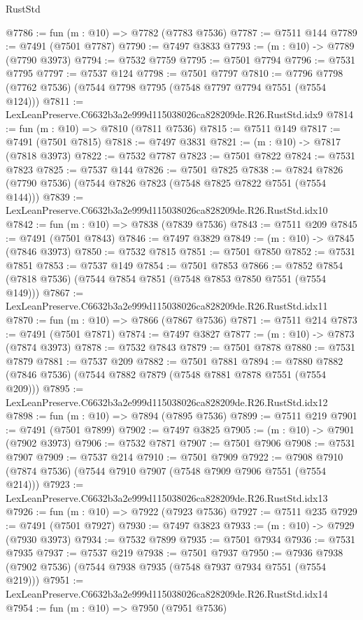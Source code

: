 \begin{lexlean}{RustStd}
\begin{coremodule}
@7786 := fun (m : @10) => @7782 (@7783 @7536)
@7787 := @7511 @144
@7789 := @7491 (@7501 @7787)
@7790 := @7497 @3833
@7793 := (m : @10) -> @7789 (@7790 @3973)
@7794 := @7532 @7759
@7795 := @7501 @7794
@7796 := @7531 @7795
@7797 := @7537 @124
@7798 := @7501 @7797
@7810 := @7796 @7798 (@7762 @7536) (@7544 @7798 @7795 (@7548 @7797 @7794 @7551 (@7554 @124)))
@7811 := LexLeanPreserve.C6632b3a2e999d115038026ca828209de.R26.RustStd.idx9
@7814 := fun (m : @10) => @7810 (@7811 @7536)
@7815 := @7511 @149
@7817 := @7491 (@7501 @7815)
@7818 := @7497 @3831
@7821 := (m : @10) -> @7817 (@7818 @3973)
@7822 := @7532 @7787
@7823 := @7501 @7822
@7824 := @7531 @7823
@7825 := @7537 @144
@7826 := @7501 @7825
@7838 := @7824 @7826 (@7790 @7536) (@7544 @7826 @7823 (@7548 @7825 @7822 @7551 (@7554 @144)))
@7839 := LexLeanPreserve.C6632b3a2e999d115038026ca828209de.R26.RustStd.idx10
@7842 := fun (m : @10) => @7838 (@7839 @7536)
@7843 := @7511 @209
@7845 := @7491 (@7501 @7843)
@7846 := @7497 @3829
@7849 := (m : @10) -> @7845 (@7846 @3973)
@7850 := @7532 @7815
@7851 := @7501 @7850
@7852 := @7531 @7851
@7853 := @7537 @149
@7854 := @7501 @7853
@7866 := @7852 @7854 (@7818 @7536) (@7544 @7854 @7851 (@7548 @7853 @7850 @7551 (@7554 @149)))
@7867 := LexLeanPreserve.C6632b3a2e999d115038026ca828209de.R26.RustStd.idx11
@7870 := fun (m : @10) => @7866 (@7867 @7536)
@7871 := @7511 @214
@7873 := @7491 (@7501 @7871)
@7874 := @7497 @3827
@7877 := (m : @10) -> @7873 (@7874 @3973)
@7878 := @7532 @7843
@7879 := @7501 @7878
@7880 := @7531 @7879
@7881 := @7537 @209
@7882 := @7501 @7881
@7894 := @7880 @7882 (@7846 @7536) (@7544 @7882 @7879 (@7548 @7881 @7878 @7551 (@7554 @209)))
@7895 := LexLeanPreserve.C6632b3a2e999d115038026ca828209de.R26.RustStd.idx12
@7898 := fun (m : @10) => @7894 (@7895 @7536)
@7899 := @7511 @219
@7901 := @7491 (@7501 @7899)
@7902 := @7497 @3825
@7905 := (m : @10) -> @7901 (@7902 @3973)
@7906 := @7532 @7871
@7907 := @7501 @7906
@7908 := @7531 @7907
@7909 := @7537 @214
@7910 := @7501 @7909
@7922 := @7908 @7910 (@7874 @7536) (@7544 @7910 @7907 (@7548 @7909 @7906 @7551 (@7554 @214)))
@7923 := LexLeanPreserve.C6632b3a2e999d115038026ca828209de.R26.RustStd.idx13
@7926 := fun (m : @10) => @7922 (@7923 @7536)
@7927 := @7511 @235
@7929 := @7491 (@7501 @7927)
@7930 := @7497 @3823
@7933 := (m : @10) -> @7929 (@7930 @3973)
@7934 := @7532 @7899
@7935 := @7501 @7934
@7936 := @7531 @7935
@7937 := @7537 @219
@7938 := @7501 @7937
@7950 := @7936 @7938 (@7902 @7536) (@7544 @7938 @7935 (@7548 @7937 @7934 @7551 (@7554 @219)))
@7951 := LexLeanPreserve.C6632b3a2e999d115038026ca828209de.R26.RustStd.idx14
@7954 := fun (m : @10) => @7950 (@7951 @7536)

\end{coremodule}
\end{lexlean}
